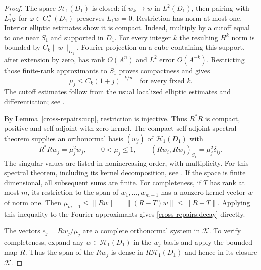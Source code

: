 \documentclass[11pt]{article}
\theoremstyle{definition}
\theoremstyle{remark}
\numberwithin{equation}{section}
\begin{document}
\begin{proof}
The space $\mathcal H_1(D_1)$ is closed: if $w_k\to w$ in $L^2(D_1)$,
then pairing with $L_1^*\varphi$ for
$\varphi\in C_c^\infty(D_1)$ preserves $L_1w=0$.
Restriction has norm at most one. Interior elliptic estimates show it is
compact. Indeed, multiply by a cutoff equal to one near $\overline S_1$
and supported in $D_1$. For every integer $k$ the resulting $H^k$ norm is
bounded by $C_k\|w\|_{D_1}$. Fourier projection on a cube containing this
support, after extension by zero, has rank $O(A^n)$ and $L^2$ error
$O(A^{-k})$. Restricting those finite-rank approximants to $S_1$ proves
compactness and gives
\begin{equation}\label{cross-repairs:decay}
 \mu_j\le C_k(1+j)^{-k/n}
 \quad\text{for every fixed }k.
\end{equation}
The cutoff estimates follow from the usual localized elliptic estimates
and differentiation; see
\citet[Theorem~17.1.3 and the extension by Friedrichs' lemma,
pp.~6--9]{HormanderIII2007}.

By Lemma~\ref{cross-repairs:ucp}, restriction is injective.
Thus $R^*R$ is compact, positive and self-adjoint with zero kernel.
The compact self-adjoint spectral theorem supplies an orthonormal basis
$(w_j)$ of $\mathcal H_1(D_1)$ with
\[
 R^*Rw_j=\mu_j^2w_j,
 \qquad 0<\mu_j\le1,
 \qquad (Rw_i,Rw_j)_{S_1}=\mu_j^2\delta_{ij}.
\]
The singular values are listed in nonincreasing order, with multiplicity.
For this spectral theorem, including its kernel decomposition, see
\citet[Theorem~2.36, pp.~47--48]{McLean2000}.
If the space is finite dimensional, all subsequent sums are finite.
For completeness, if $T$ has rank at most $m$, its restriction to the
span of $w_1,\ldots,w_{m+1}$ has a nonzero kernel vector $w$ of norm one.
Then $\mu_{m+1}\le\|Rw\|=\|(R-T)w\|\le\|R-T\|$.
Applying this inequality to the Fourier approximants gives
\eqref{cross-repairs:decay} directly.

The vectors $e_j=Rw_j/\mu_j$ are a complete orthonormal system in
$\mathcal K$. To verify completeness, expand any
$w\in\mathcal H_1(D_1)$ in the $w_j$ basis and apply the bounded map $R$.
Thus the span of the $Rw_j$ is dense in $R\mathcal H_1(D_1)$ and hence
in its closure $\mathcal K$.


\end{proof}
\end{document}
